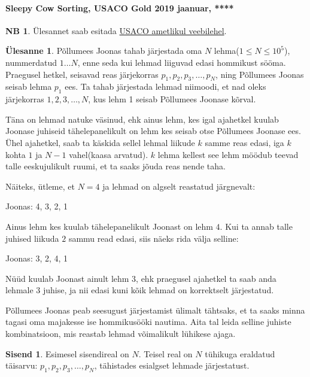 \documentclass{trkut}
\theoremstyle{definition}
\newtheorem*{extra}{NB}
\newtheorem*{Input}{Sisend}
\newtheorem*{Text}{Ülesanne}
\begin{document}
\paragraph{Sleepy Cow Sorting, USACO Gold 2019 jaanuar, ****}
\begin{extra}
Ülesannet saab esitada \href{http://www.usaco.org/index.php?page=viewproblem2&cpid=898}{USACO ametlikul veebilehel}.
\end{extra}
\begin{Text}
Põllumees Joonas tahab järjestada oma $N$ lehma($1\le N\le 10^5$), nummerdatud $1…N$, enne seda kui lehmad liiguvad edasi hommikust sööma.
Praegusel hetkel, seisavad reas järjekorras $p_1,p_2,p_3,…,p_N$, ning Põllumees Joonas seisab lehma $p_1$ ees. Ta tahab järjestada lehmad niimoodi, et nad oleks järjekorras $1,2,3,…,N$, kus lehm 1 seisab Põllumees Joonase kõrval.

Täna on lehmad natuke väsinud, ehk ainus lehm, kes igal ajahetkel  kuulab Joonase juhiseid tähelepanelikult on lehm kes seisab otse Põllumees Joonase ees. Ühel ajahetkel, saab ta käskida sellel lehmal liikude $k$ samme reas edasi, iga $k$ kohta $1$ ja $N−1$ vahel(kaasa arvatud). $k$ lehma kellest see lehm möödub teevad talle eeskujulikult ruumi, et ta saaks jõuda reas nende taha.

Näiteks, ütleme, et $N=4$ ja lehmad on algselt reastatud järgnevalt:

Joonas: 4, 3, 2, 1 

Ainus lehm kes kuulab tähelepanelikult Joonast on lehm $4$. 
Kui ta annab talle juhised liikuda $2$ sammu read edasi, siis näeks rida välja selline:

Joonas: 3, 2, 4, 1 

Nüüd kuulab Joonast ainult lehm $3$, ehk praegusel ajahetkel ta saab anda lehmale $3$ juhise, ja nii edasi kuni kõik lehmad on korrektselt järjestatud.

Põllumees Joonas peab seesugust järjestamist ülimalt tähtsaks, et ta saaks minna tagasi oma majakesse ise hommikusööki nautima. 
Aita tal leida selline juhiste kombinatsioon, mis reastab lehmad võimalikult lühikese ajaga.

\parencite{27}
\end{Text}

\begin{Input}
Esimesel sisendireal on  $N$. 
Teisel real on $N$ tühikuga eraldatud täisarvu: $p_1,p_2,p_3,…,p_N$, tähistades esialgset lehmade järjestatust.
\end{Input}
\end{document}

